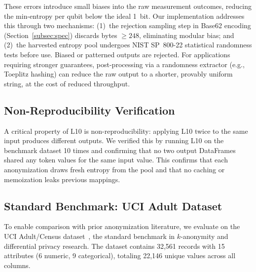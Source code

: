 \documentclass[journal]{IEEEtran}
\begin{document}
These errors introduce small biases into the raw measurement outcomes, reducing the min-entropy per qubit below the ideal 1~bit. Our implementation addresses this through two mechanisms: (1)~the rejection sampling step in Base62 encoding (Section~\ref{subsec:spec}) discards bytes $\geq 248$, eliminating modular bias; and (2)~the harvested entropy pool undergoes NIST SP~800-22 statistical randomness tests before use. Biased or patterned outputs are rejected. For applications requiring stronger guarantees, post-processing via a randomness extractor (e.g., Toeplitz hashing) can reduce the raw output to a shorter, provably uniform string, at the cost of reduced throughput.

\subsection{Non-Reproducibility Verification}

A critical property of L10 is non-reproducibility: applying L10 twice to the same input produces different outputs. We verified this by running L10 on the benchmark dataset 10 times and confirming that no two output DataFrames shared any token values for the same input value. This confirms that each anonymization draws fresh entropy from the pool and that no caching or memoization leaks previous mappings.

\subsection{Standard Benchmark: UCI Adult Dataset}

To enable comparison with prior anonymization literature, we evaluate on the UCI Adult/Census dataset~\cite{dua2019uci}, the standard benchmark in $k$-anonymity and differential privacy research. The dataset contains 32,561 records with 15 attributes (6 numeric, 9 categorical), totaling 22,146 unique values across all columns.
\end{document}
